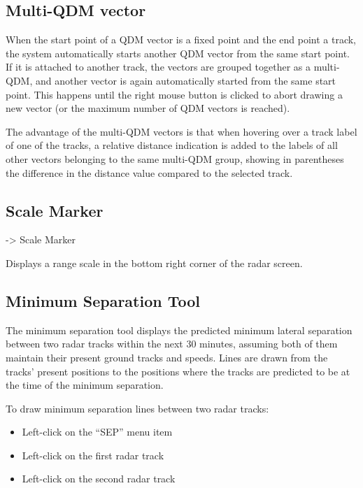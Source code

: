 \documentclass[a4paper,oneside,11pt]{memoir}
\begin{document}
\subsection{Multi-QDM vector}

When the start point of a QDM vector is a fixed point and the end point a track, the system automatically starts another QDM vector from the same start point. If it is attached to another track, the vectors are grouped together as a multi-QDM, and another vector is again automatically started from the same start point. This happens until the right mouse button is clicked to abort drawing a new vector (or the maximum number of QDM vectors is reached).

\bigskip

The advantage of the multi-QDM vectors is that when hovering over a track label of one of the tracks, a relative distance indication is added to the labels of all other vectors belonging to the same multi-QDM group, showing in parentheses the difference in the distance value compared to the selected track.

\subsection{Scale Marker}
\label{scale}

 -> Scale Marker


Displays a range scale in the bottom right corner of the radar screen.

\subsection{Minimum Separation Tool}\label{tool:mst}

The minimum separation tool displays the predicted minimum lateral separation between two radar tracks within the next 30 minutes, assuming both of them maintain their present ground tracks and speeds. Lines are drawn from the tracks’ present positions to the positions where the tracks are predicted to be at the time of the minimum separation.

To draw minimum separation lines between two radar tracks:
\begin{itemize}
    \item Left-click on the “SEP” menu item
    \item Left-click on the first radar track
    \item Left-click on the second radar track
\end{itemize}
\end{document}
